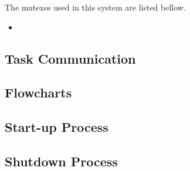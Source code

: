The mutexes used in this system are listed bellow.

\begin{itemize}
	\item 
	
\end{itemize}


\subsection{Task Communication}

\subsection{Flowcharts}


\subsection{Start-up Process}

\subsection{Shutdown Process}
